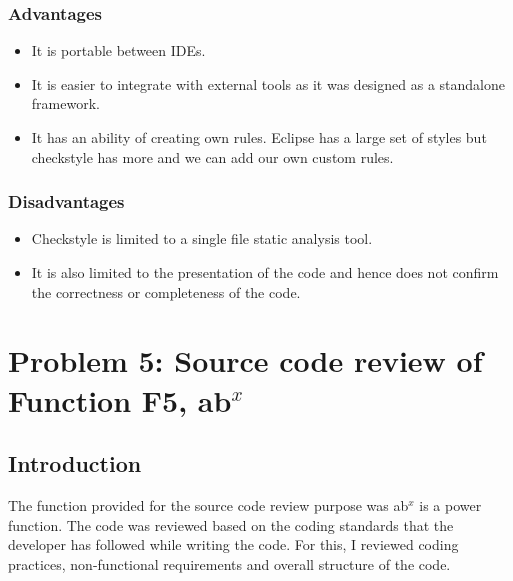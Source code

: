 \documentclass[a4paper,12pt]{article}
\begin{document}
    \subsubsection{Advantages}
    \begin{itemize}
        \item It is portable between IDEs.
        \item It is easier to integrate with external tools as it was designed as a standalone framework.
        \item It has an ability of creating own rules. Eclipse has a large set of styles but checkstyle has more and we can add our own custom rules.
    \end{itemize}
    
    \subsubsection{Disadvantages}
    \begin{itemize}
        \item Checkstyle is limited to a single file static analysis tool.
        \item It is also limited to the presentation of the code and hence does not confirm the correctness or completeness of the code.
    \end{itemize}
    
    \newpage
    
    \section{Problem 5: Source code review of Function F5, ab$^x$}
    \subsection{Introduction}
    The function provided for the source code review purpose was ab$^x$ is a power function. The code was reviewed based on the coding standards that the developer has followed while writing the code. For this, I reviewed coding practices, non-functional requirements and overall structure of the code.
    
\end{document}
